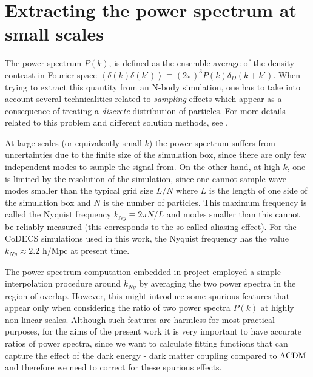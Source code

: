 \section{\label{sec:Folding-method}Extracting the power spectrum at small
scales}


The power spectrum $P(k)$, is defined as the ensemble average of
the density contrast in Fourier space $\left\langle \delta(k)\delta(k')\right\rangle \equiv(2\pi)^{3}P(k)\delta_{D}(k+k')$.
When trying to extract this quantity from an N-body simulation, one
has to take into account several technicalities related to \emph{sampling}
effects which appear as a consequence of treating a \emph{discrete
}distribution of particles. For more details related to this problem
and different solution methods, see \citep{cui_ideal_2008}.

At large scales (or equivalently small $k$) the power spectrum suffers
from uncertainties due to the finite size of the simulation box, since
there are only few independent modes to sample the signal from. On
the other hand, at high $k$, one is limited by the resolution of
the simulation, since one cannot sample wave modes smaller than the
typical grid size $L/N$ where $L$ is the length of one side of the
simulation box and $N$ is the number of particles. This maximum frequency
is called the Nyquist frequency $k_{Ny}\equiv2\pi N/L$ and modes
smaller than this \textcolor{black}{cannot be reliably measured} (this
corresponds to the so-called aliasing effect). For the CoDECS simulations
used in this work, the Nyquist frequency has the value $k_{Ny}\approx2.2$
$\mbox{h}/\mbox{Mpc}$ at present time.

The power spectrum computation embedded in  project employed
a simple interpolation procedure around $k_{Ny}$ by averaging the
two power spectra in the region of overlap. However, this might introduce
some spurious features that appear only when considering the ratio
of two power spectra $P(k)$ at highly non-linear scales. Although
such features are harmless for most practical purposes, for the aims
of the present work it is very important to have accurate ratios of
power spectra, since we want to calculate fitting functions that can
capture the effect of the dark energy - dark matter coupling compared
to $\Lambda\mathrm{CDM}$ and therefore we need to correct for these spurious effects.

